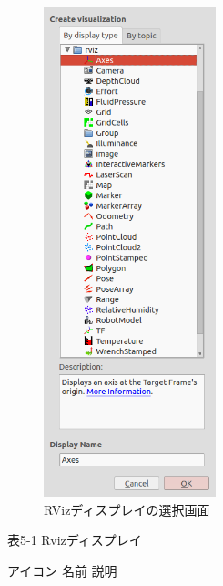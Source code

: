 \begin{figure}[h]
  \centering
  \includegraphics[width=5cm]{pictures/chapter5/pic_05_06.png}
  \caption{RVizディスプレイの選択画面}
\end{figure}

表5-1 Rvizディスプレイ

アイコン  名前  説明

